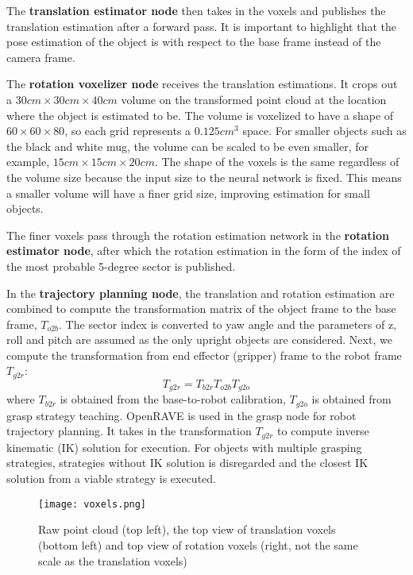 \documentclass[conference]{IEEEtran}
\begin{document}
The \textbf{translation estimator node} then takes in the voxels and publishes the translation estimation after a forward pass. It is important to highlight that the pose estimation of the object is with respect to the base frame instead of the camera frame.

The \textbf{rotation voxelizer node} receives the translation estimations. It crops out a $30 cm\times30 cm\times40 cm$ volume on the transformed point cloud at the location where the object is estimated to be. The volume is voxelized to have a shape of $60\times60\times80$, so each grid represents a $0.125 cm^{3}$ space. For smaller objects such as the black and white mug, the volume can be scaled to be even smaller, for example, $15 cm\times15 cm\times20 cm$. The shape of the voxels is the same regardless of the volume size because the input size to the neural network is fixed. This means a smaller volume will have a finer grid size, improving estimation for small objects.

The finer voxels pass through the rotation estimation network in the \textbf{rotation estimator node}, after which the rotation estimation in the form of the index of the most probable 5-degree sector is published.

In the \textbf{trajectory planning node}, the translation and rotation estimation are combined to compute the transformation matrix of the object frame to the base frame, $T_{o2b}$. The sector index is converted to yaw angle and the parameters of z, roll and pitch are assumed as the only upright objects are considered. Next, we compute the transformation from end effector (gripper) frame to the robot frame $T_{g2r}$:
$$T_{g2r} = T_{b2r}T_{o2b}T_{g2o}$$
where $T_{b2r}$ is obtained from the base-to-robot calibration, $T_{g2o}$ is obtained from grasp strategy teaching. OpenRAVE is used in the grasp node for robot trajectory planning. It takes in the transformation $T_{g2r}$ to compute inverse kinematic (IK) solution for execution. For objects with multiple grasping strategies, strategies without IK solution is disregarded and the closest IK solution from a viable strategy is executed.

\begin{figure}[htbp]
 \centerline{\texttt{[image: voxels.png]}}
 \caption{Raw point cloud (top left), the top view of translation voxels (bottom left) and top view of rotation voxels (right, not the same scale as the translation voxels)}
 \label{fig_voxels}
\end{figure}
\end{document}
